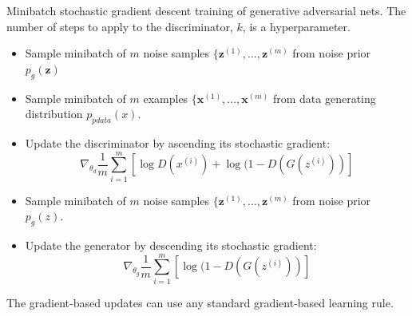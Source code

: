 \begin{algorithm}
\caption{Minibatch stochastic gradient descent training of generative adversarial nets. The number of steps to apply to the discriminator, $k$, is a hyperparameter.}\label{alg:training optimisation}
\begin{algorithmic}
         \Statex\begin{itemize}
         \setlength{\itemindent}{.2in}
             \item Sample minibatch of $m$ noise samples $\{ \mathbf{z}^{(1)}, ..., \mathbf{z}^{(m)}$ from noise prior $p_g(\mathbf{z})$
             \item Sample minibatch of $m$ examples $\{ \mathbf{x}^{(1)}, ..., \mathbf{x}^{(m)}$ from data generating distribution $p_{pdata}(x)$.
             \item Update the discriminator by ascending its stochastic gradient: 
                \begin{equation}
                \label{eq:update rule discriminator}
                    \nabla_{\theta_d}\frac{1}{m}\sum_{i=1}^m [ \log D(x^{(i)}) + \log (1 - D(G(z^{(i)})) ]
                \end{equation}
         \end{itemize}
    \EndFor
    \begin{itemize}
     \setlength{\itemindent}{.2in}
        \item Sample minibatch of $m$ noise samples $\{ \mathbf{z}^{(1)}, ..., \mathbf{z}^{(m)}$ from noise prior $p_g(z)$. 
        \item Update the generator by descending its stochastic gradient:
        \begin{equation}
        \label{eq:update rule generator}
            \nabla_{\theta_g}\frac{1}{m}\sum_{i=1}^m [ \log (1 - D(G(z^{(i)})) ]
        \end{equation}
    \end{itemize}
\EndFor
\end{algorithmic}
The gradient-based updates can use any standard gradient-based learning rule.
\end{algorithm}

